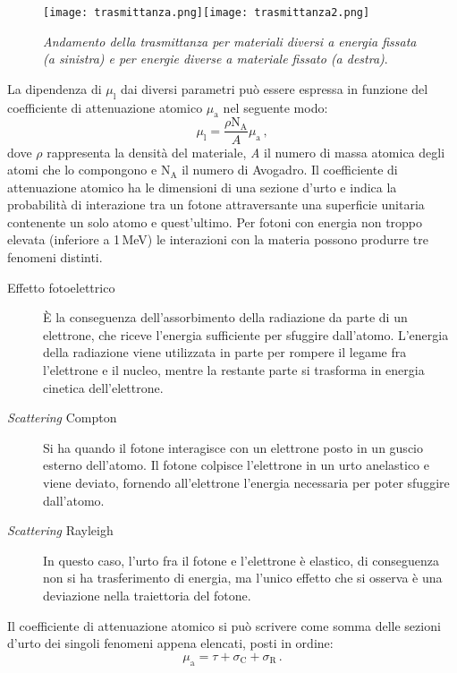 \documentclass{report}
\numberwithin{equation}{section}
\numberwithin{figure}{section}
\begin{document}
\begin{figure}[htp]
\centering
\texttt{[image: trasmittanza.png]}\quad\texttt{[image: trasmittanza2.png]}
\caption{\label{fig:trasmittanza} \textit{Andamento della trasmittanza per materiali diversi a energia fissata (a sinistra) e per energie diverse a materiale fissato (a destra)}.}
\end{figure}

\noindent La dipendenza di $\mu_\mathrm{l}$ dai diversi parametri può essere espressa in funzione del coefficiente di attenuazione atomico $\mu_\mathrm{a}$ nel seguente modo:
\begin{equation}
    \mu_\mathrm{l} = \frac{\rho \mathrm{N_A}}{A} \mu_\mathrm{a}\,,
\end{equation}
dove $\rho$ rappresenta la densità del materiale, \textit{A} il numero di massa atomica degli atomi che lo compongono e $\mathrm{N_A}$ il numero di Avogadro. Il coefficiente di attenuazione atomico ha le dimensioni di una sezione d'urto e indica la probabilità di interazione tra un fotone attraversante una superficie unitaria contenente un solo atomo e quest'ultimo. Per fotoni con energia non troppo elevata (inferiore a 1\,MeV) le interazioni con la materia possono produrre tre fenomeni distinti.
\begin{description}
    \item[Effetto fotoelettrico] È la conseguenza dell'assorbimento della radiazione da parte di un elettrone, che riceve l'energia sufficiente per sfuggire dall'atomo. L'energia della radiazione viene utilizzata in parte per rompere il legame fra l'elettrone e il nucleo, mentre la restante parte si trasforma in energia cinetica dell'elettrone.
    \item[\textit{Scattering} Compton] Si ha quando il fotone interagisce con un elettrone posto in un guscio esterno dell'atomo. Il fotone colpisce l'elettrone in un urto anelastico e viene deviato, fornendo all'elettrone l'energia necessaria per poter sfuggire dall'atomo.
    \item[\textit{Scattering} Rayleigh] In questo caso, l'urto fra il fotone e l'elettrone è elastico, di conseguenza non si ha trasferimento di energia, ma l'unico effetto che si osserva è una deviazione nella traiettoria del fotone.
\end{description}
Il coefficiente di attenuazione atomico si può scrivere come somma delle sezioni d'urto dei singoli fenomeni appena elencati, posti in ordine:
\begin{equation}
    \mu_\mathrm{a} = \tau + \sigma_\mathrm{C} + \sigma_\mathrm{R}\,.
\end{equation}
\end{document}

